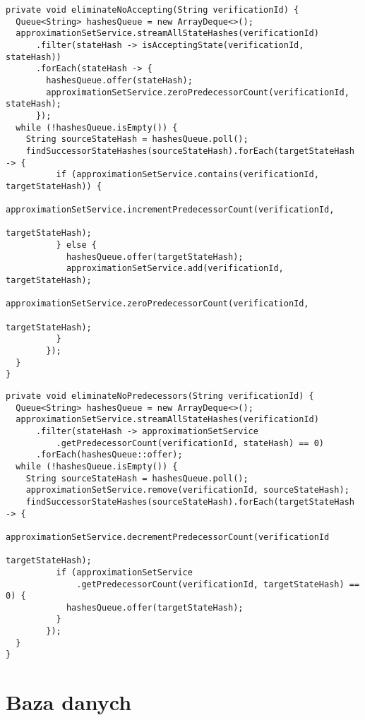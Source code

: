 \begin{minipage}{\linewidth}
\begin{lstlisting}[caption={Implementacja funkcji usuwającej stany nieakceptujące ze zbioru.},captionpos=b,label={lst:eliminateNoAcceptingStates}]
private void eliminateNoAccepting(String verificationId) {
  Queue<String> hashesQueue = new ArrayDeque<>();
  approximationSetService.streamAllStateHashes(verificationId)
      .filter(stateHash -> isAcceptingState(verificationId, stateHash))
      .forEach(stateHash -> {
        hashesQueue.offer(stateHash);
        approximationSetService.zeroPredecessorCount(verificationId, stateHash);
      });
  while (!hashesQueue.isEmpty()) {
    String sourceStateHash = hashesQueue.poll();
    findSuccessorStateHashes(sourceStateHash).forEach(targetStateHash -> {
          if (approximationSetService.contains(verificationId, targetStateHash)) {
            approximationSetService.incrementPredecessorCount(verificationId,
                                                              targetStateHash);
          } else {
            hashesQueue.offer(targetStateHash);
            approximationSetService.add(verificationId, targetStateHash);
            approximationSetService.zeroPredecessorCount(verificationId,
                                                         targetStateHash);
          }
        });
  }
}
\end{lstlisting}
\end{minipage}
\begin{minipage}{\linewidth}
\begin{lstlisting}[caption={Implementacja funkcji usuwającej stany niemające poprzedników ze zbioru.},captionpos=b,label={lst:eliminateNoPredecessorsStates}]
private void eliminateNoPredecessors(String verificationId) {
  Queue<String> hashesQueue = new ArrayDeque<>();
  approximationSetService.streamAllStateHashes(verificationId)
      .filter(stateHash -> approximationSetService
          .getPredecessorCount(verificationId, stateHash) == 0)
      .forEach(hashesQueue::offer);
  while (!hashesQueue.isEmpty()) {
    String sourceStateHash = hashesQueue.poll();
    approximationSetService.remove(verificationId, sourceStateHash);
    findSuccessorStateHashes(sourceStateHash).forEach(targetStateHash -> {
          approximationSetService.decrementPredecessorCount(verificationId
                                                            targetStateHash);
          if (approximationSetService
              .getPredecessorCount(verificationId, targetStateHash) == 0) {
            hashesQueue.offer(targetStateHash);
          }
        });
  }
}
\end{lstlisting}
\end{minipage}



\section{Baza danych}

